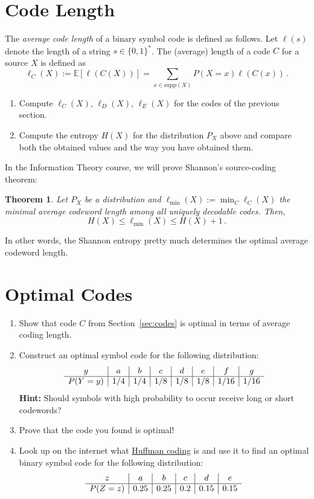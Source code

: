 \documentclass[11p,a4paper]{article}
\newtheorem{theorem}{Theorem}
\begin{document}
\section{Code Length}
\newcommand{\len}{\ell}
 The \emph{average code length} of a binary symbol code is defined as follows.
Let $\len(s)$ denote the length of a string $s \in \{0,1\}^*$. The (average) length of a code $C$ for a source $X$ is defined as
\[
\len_C(X) := \mathbb{E}[\len(C(X))] = \sum_{x \in \mathrm{supp}(X)} P(X=x) \len(C(x)) \, .
\]
\begin{enumerate}
\item Compute $\len_C(X)$, $\len_D(X)$, $\len_E(X)$ for the codes of the previous section.
\item Compute the entropy $H(X)$ for the distribution $P_X$ above and compare both the obtained values
  and the way you have obtained them.
\end{enumerate}

In the Information Theory course, we will prove Shannon's
source-coding theorem:
\begin{theorem}
Let $P_X$ be a distribution and $\ell_{\min}(X) := \min_C \len_C(X)$
the minimal average codeword length among all uniquely decodable
codes. Then,
\[
H(X) \leq \ell_{\min}(X) \leq H(X)+1 \, .
\]
\end{theorem}
In other words, the Shannon entropy pretty much determines the optimal
average codeword length.

\section{Optimal Codes}
\begin{enumerate}
\item Show that code $C$ from Section~\ref{sec:codes} is optimal in
  terms of average coding length.
\item Construct an optimal symbol code for the following
  distribution:
\[
\begin{array}{c | c | c | c | c | c | c | c}
y & a & b & c & d & e & f & g\\
\hline
P(Y=y) & 1/4 & 1/4   & 1/8   & 1/8 & 1/8 & 1/16 & 1/16 \\
\end{array}
\]
{\bf Hint:} Should symbols with high probability to occur receive long or short codewords?
\item Prove that the code you found is optimal!
\item Look up on the internet what
  \href{https://en.wikipedia.org/wiki/Huffman_coding}{Huffman coding}
  is and use it to find an optimal binary symbol code for the following distribution:
\[
\begin{array}{c | c | c | c | c | c}
z & a & b & c & d & e\\
\hline
P(Z=z) & 0.25 & 0.25   & 0.2   & 0.15 & 0.15 \\
\end{array}
\]



\end{enumerate}
\end{document}
